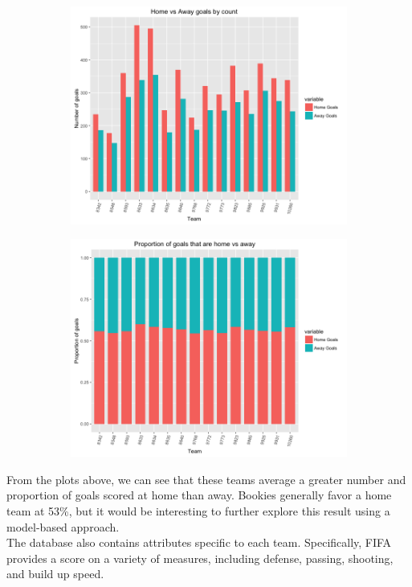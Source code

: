 \documentclass{article}
\begin{document}
\begin{figure}[H]
\centering
\begin{subfigure}{.5\textwidth}
  \centering
  \includegraphics[width=.8\linewidth]{homevsawaycount.png}
  \label{fig:sub1}
\end{subfigure}%
\begin{subfigure}{.5\textwidth}
  \centering
  \includegraphics[width=.8\linewidth]{homevsawaygoals.png}
  \label{fig:sub2}
\end{subfigure}
\end{figure}

From the plots above, we can see that these teams average a greater number and proportion of goals scored at home than away. Bookies generally favor a home team at 53\%, but it would be interesting to further explore this result using a model-based approach.\\

The database also contains attributes specific to each team. Specifically, FIFA provides a score on a variety of measures, including defense, passing, shooting, and build up speed. \\
\end{document}
